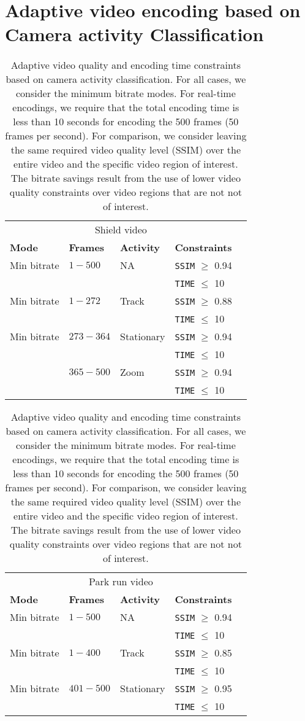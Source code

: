 \documentclass{book}
\begin{document}
	
	
	
	
	\chapter{ Adaptive video encoding based on Camera activity Classification}
\begin{table}[t!]
	\caption{\label{tbl:adaptive}
		Adaptive video quality and encoding time constraints based on
		camera activity classification.
		For all cases, we consider the minimum bitrate modes.
		For real-time encodings, we require that the total encoding
		time is less than 10 seconds for encoding the 500 frames
		(50 frames per second).
		For comparison, we consider leaving the same required video
		quality level (SSIM)  over the entire video and the specific
		video region of interest.
		The bitrate savings result from the use of lower video quality
		constraints over video regions that are not not of interest.                
	}
	\begin{tabular}{lllll}
		\multicolumn{4}{c}{Shield video}\\
		{\bf Mode} & {\bf Frames} & {\bf Activity} & {\bf Constraints} \\
		\hline \hline 
		Min bitrate & $1 - 500$ & NA & {\tt SSIM} $\geq$ 0.94\\
		&                  &             & {\tt TIME} $\leq$ 10 \\
		\hline
		Min bitrate & $1 - 272$ & Track & {\tt SSIM} $\geq$ 0.88\\
		&         &       & {\tt TIME} $\leq$ 10\\[0.03 true in]
		Min bitrate & $ 273 - 364$ & Stationary & {\tt SSIM} $\geq$ 0.94\\
		&                        &                  & {\tt TIME} $\leq$ 10\\[0.03 true in]
		& $ 365 - 500$ & Zoom       & {\tt SSIM} $\geq$ 0.94\\
		&                        &                 & {\tt TIME} $\leq$ 10\\
		\hline
	\end{tabular}
	\bigskip
	
	\begin{tabular}{lllll}
		\multicolumn{4}{c}{Park run video}\\ 
		{\bf Mode} & {\bf Frames} & {\bf Activity} & {\bf Constraints} \\
		\hline \hline
		Min bitrate  & $1 - 500$ & NA & {\tt SSIM} $\geq$ 0.94\\
		&           &             & {\tt TIME} $\leq$ 10\\
		\hline
		Min bitrate & $1 - 400$ & Track & {\tt SSIM} $\geq$ 0.85\\
		&         &       & {\tt TIME} $\leq$ 10\\[0.03 true in]
		Min bitrate  & $ 401 - 500$ & Stationary & {\tt SSIM} $\geq$ 0.95\\
		&         &       & {\tt TIME} $\leq$ 10\\
		\hline
	\end{tabular}
\end{table}
\end{document}
